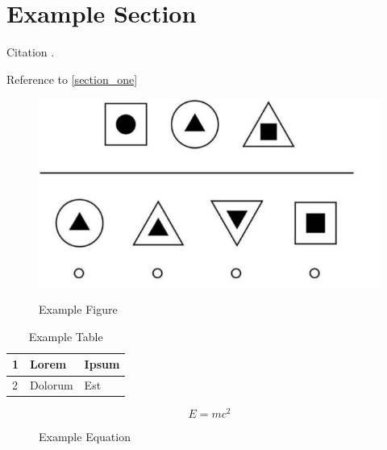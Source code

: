 \documentclass{article}
\begin{document}
\section{Example Section}\label{section_one}

Citation \cite{aharonov2008quantum}.

\vspace{1cm}

Reference to \autoref{section_one}

\begin{figure}[H]
  \centering
  \includegraphics[scale=.5]{figures/example_figure.png} \\
  \caption{Example Figure}\label{fig:example_figure}
\end{figure}

\begin{table}[htbp]
  \centering
  \begin{tabularx}{\textwidth}{| p{1cm} | X | p{6cm} |}
    \hline
      1 & Lorem
        & Ipsum \\ \hline
      2 & Dolorum
        & Est \\ \hline
  \end{tabularx}
  \caption{Example Table}\label{tbl:example_table}
\end{table}

\begin{figure}[H]
  \[ E = m c^2 \]
  \caption{Example Equation}\label{eq:example_equation}
\end{figure}

\listoffigures
\listoftables
\printbibliography
\end{document}
